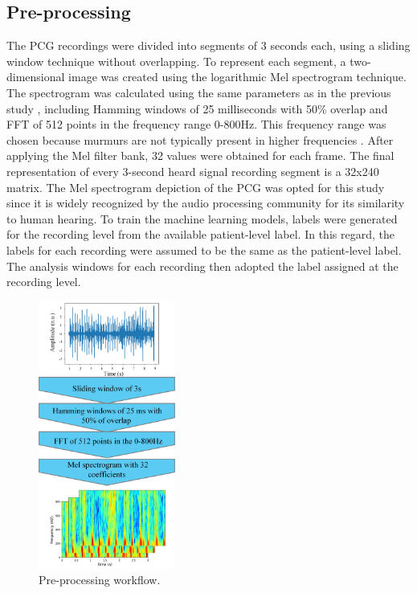 \documentclass{article}
\begin{document}
\subsection{Pre-processing}
The PCG recordings were divided into segments of 3 seconds each, using a sliding window technique without overlapping. To represent each segment, a two-dimensional image was created using the logarithmic Mel spectrogram technique. The spectrogram was calculated using the same parameters as in the previous study \cite{elola2022beyond}, including Hamming windows of 25 milliseconds with 50\% overlap and FFT of 512 points in the frequency range 0-800Hz. This frequency range was chosen because murmurs are not typically present in higher frequencies \cite{mcgee2018auscultation}. After applying the Mel filter bank, 32 values were obtained for each frame.
The final representation of every 3-second heard signal recording segment is a 32x240 matrix. The Mel spectrogram depiction of the PCG was opted for this study since it is widely recognized by the audio processing community for its similarity to human hearing. To train the machine learning models, labels were generated for the recording level from the available patient-level label. In this regard, the labels for each recording were assumed to be the same as the patient-level label. The analysis windows for each recording then adopted the label assigned at the recording level.


\begin{figure}
\centering
    \includegraphics[width=0.4\textwidth]{Documents/preprecessing.jpg}
    \caption{Pre-processing workflow.}
    \label{tab:PP}

\end{figure}
\end{document}
